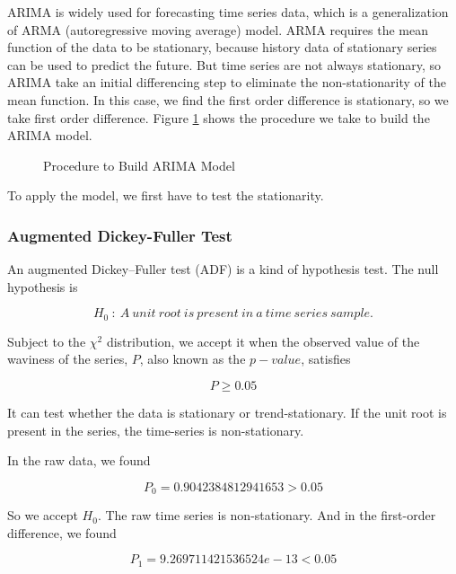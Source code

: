 \documentclass[12pt,a4paper]{article}
\newcommand{\Predictor}{ARIMA }
\begin{document}
\begin{spacing}{1.2}
\Predictor is widely used for forecasting time series data, which is a generalization of ARMA (autoregressive moving average) model. ARMA requires the mean function of the data to be stationary, because history data of stationary series can be used to predict the future. But time series are not always stationary, so ARIMA take an initial differencing step to eliminate the non-stationarity of the mean function. In this case, we find the first order difference is stationary, so we take first order difference. Figure \ref{figure:flow_chart} shows the procedure we take to build the \Predictor model.

 \begin{figure}[H]
 	\caption{Procedure to Build ARIMA Model}
 	\label{figure:flow_chart}
 \end{figure}


To apply the model, we first have to test the stationarity.

\subsubsection{Augmented Dickey-Fuller Test}

An augmented Dickey–Fuller test (ADF) is a kind of hypothesis test. The null hypothesis is 

$$
H_0 \ : \ A \ unit \ root \ is \ present \ in \ a \ time \ series \ sample.
$$

Subject to the $\chi^2$ distribution, we accept it when the observed value of the waviness of the series, $P$, also known as the $p-value$, satisfies

$$
P \ge 0.05
$$

It can test whether the data is stationary or trend-stationary. If the unit root is present in the series, the time-series is non-stationary.

In the raw data, we found

$$
P_0=0.9042384812941653 > 0.05
$$

So we accept $H_0$. The raw time series is non-stationary.
And in the first-order difference, we found

$$
P_1=9.269711421536524e-13 < 0.05
$$


\end{spacing}
\end{document}
